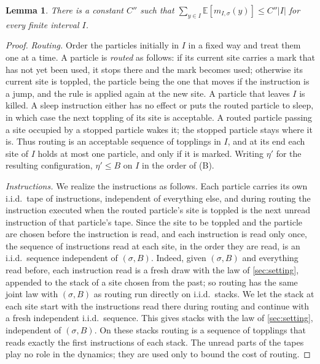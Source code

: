 \documentclass[11pt]{article}
\newtheorem{lemma}[theorem]{Lemma}
\theoremstyle{remark}
\newcommand{\E}{\mathbb E}
\newcommand{\1}{\mathbf 1}
\begin{document}
\begin{lemma}\label{lem:interval}
There is a constant $C''$ such that $\sum_{y\in I}\E[m_{I,\sigma}(y)]\le C''|I|$ for every finite interval $I$.
\end{lemma}

\begin{proof}
\emph{Routing.} Order the particles initially in $I$ in a fixed way and treat them one at a time. A particle is \emph{routed} as follows: if its current site carries a mark that has not yet been used, it stops there and the mark becomes used; otherwise its current site is toppled, the particle being the one that moves if the instruction is a jump, and the rule is applied again at the new site. A particle that leaves $I$ is killed. A sleep instruction either has no effect or puts the routed particle to sleep, in which case the next toppling of its site is acceptable. A routed particle passing a site occupied by a stopped particle wakes it; the stopped particle stays where it is. Thus routing is an acceptable sequence of topplings in $I$, and at its end each site of $I$ holds at most one particle, and only if it is marked. Writing $\eta'$ for the resulting configuration, $\eta'\le B$ on $I$ in the order of (B).

\emph{Instructions.} We realize the instructions as follows. Each particle carries its own i.i.d.\ tape of instructions, independent of everything else, and during routing the instruction executed when the routed particle's site is toppled is the next unread instruction of that particle's tape. Since the site to be toppled and the particle are chosen before the instruction is read, and each instruction is read only once, the sequence of instructions read at each site, in the order they are read, is an i.i.d.\ sequence independent of $(\sigma,B)$. Indeed, given $(\sigma,B)$ and everything read before, each instruction read is a fresh draw with the law of \cref{sec:setting}, appended to the stack of a site chosen from the past; so routing has the same joint law with $(\sigma,B)$ as routing run directly on i.i.d.\ stacks. We let the stack at each site start with the instructions read there during routing and continue with a fresh independent i.i.d.\ sequence. This gives stacks with the law of \cref{sec:setting}, independent of $(\sigma,B)$. On these stacks routing is a sequence of topplings that reads exactly the first instructions of each stack. The unread parts of the tapes play no role in the dynamics; they are used only to bound the cost of routing.


\end{proof}
\end{document}
